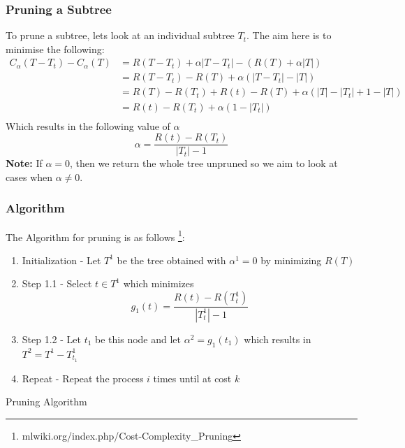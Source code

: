\documentclass[11pt,a4paper]{report}
\begin{document}
\subsubsection{Pruning a Subtree}
To prune a subtree, lets look at an individual subtree $T_t$. 
The aim here is to minimise the following:
\[ 
\begin{split}
    C_\alpha(T-T_t) - C_\alpha(T) &= R(T-T_t)+ \alpha|T-T_t| - (R(T)+ \alpha|T|)\\
    &=R(T-T_t)-R(T)+\alpha(|T-T_t|-|T|)\\
    &=R(T)-R(T_t)+R(t)-R(T) + \alpha(|T|-|T_t|+1-|T|)\\
    &=R(t)-R(T_t) + \alpha(1-|T_t|)\\
\end{split} \]
Which results in the following value of $\alpha$
\[ \alpha = \frac{R(t)-R(T_t)}{|T_t| - 1} \]
\textbf{Note:} If $\alpha = 0$, then we return the whole tree unpruned so we aim to look at cases when $\alpha \neq 0$.

\subsubsection{Algorithm}
The Algorithm for pruning is as follows \footnote{mlwiki.org/index.php/Cost-Complexity\_Pruning}:
\begin{algorithm}
\begin{enumerate}
    \item Initialization - Let $T^1$ be the tree obtained with $\alpha^1 = 0$ by minimizing $R(T)$
    
    \item Step 1.1 - Select $t \in T^1$ which minimizes
    \[ g_1 (t) = \frac{R(t)-R(T_t^1)}{|T_t^1| - 1} \]
    
    \item Step 1.2 - Let $t_1$ be this node and let $\alpha^2 = g_1 (t_1)$ which results in $T^2 = T^1 - T_{t_1}^1$
    
    \item Repeat - Repeat the process $i$ times until at cost $k$
\end{enumerate}
\caption{Pruning Algorithm}
\end{algorithm}
\end{document}
